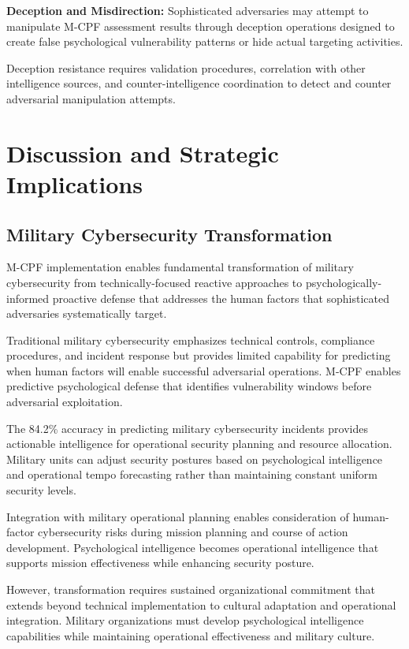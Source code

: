 \documentclass[10pt, twocolumn]{article}
\begin{document}
\textbf{Deception and Misdirection:} Sophisticated adversaries may attempt to manipulate M-CPF assessment results through deception operations designed to create false psychological vulnerability patterns or hide actual targeting activities.

Deception resistance requires validation procedures, correlation with other intelligence sources, and counter-intelligence coordination to detect and counter adversarial manipulation attempts.

\section{Discussion and Strategic Implications}

\subsection{Military Cybersecurity Transformation}

M-CPF implementation enables fundamental transformation of military cybersecurity from technically-focused reactive approaches to psychologically-informed proactive defense that addresses the human factors that sophisticated adversaries systematically target.

Traditional military cybersecurity emphasizes technical controls, compliance procedures, and incident response but provides limited capability for predicting when human factors will enable successful adversarial operations. M-CPF enables predictive psychological defense that identifies vulnerability windows before adversarial exploitation.

The 84.2\% accuracy in predicting military cybersecurity incidents provides actionable intelligence for operational security planning and resource allocation. Military units can adjust security postures based on psychological intelligence and operational tempo forecasting rather than maintaining constant uniform security levels.

Integration with military operational planning enables consideration of human-factor cybersecurity risks during mission planning and course of action development. Psychological intelligence becomes operational intelligence that supports mission effectiveness while enhancing security posture.

However, transformation requires sustained organizational commitment that extends beyond technical implementation to cultural adaptation and operational integration. Military organizations must develop psychological intelligence capabilities while maintaining operational effectiveness and military culture.
\end{document}
